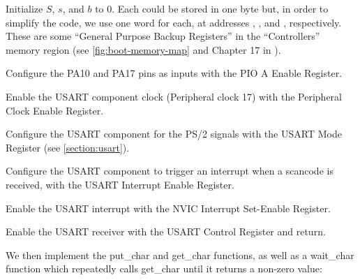 \begin{Paragraph}
\begin{paracol}{2}

Initialize $S$, $s$, and $b$ to 0. Each could be stored in one byte but, in
order to simplify the code, we use one word for each, at addresses
, , and
, respectively. These are some ``General Purpose
Backup Registers'' in the ``Controllers'' memory region (see
\cref{fig:boot-memory-map} and Chapter 17 in \cite{SAM3X8E}).


Configure the PA10 and PA17 pins as inputs with the PIO A Enable Register.


Enable the USART component clock (Peripheral clock 17) with the Peripheral
Clock Enable Register.


Configure the USART component for the PS/2 signals with the USART Mode Register
(see \cref{section:usart}).


Configure the USART component to trigger an interrupt when a scancode is
received, with the USART Interrupt Enable Register.


Enable the USART interrupt with the NVIC Interrupt Set-Enable Register.


Enable the USART receiver with the USART Control Register and return.

\end{paracol}
\end{Paragraph}

We then implement the put\_char and get\_char functions, as well as a
wait\_char function which repeatedly calls get\_char until it returns a
non-zero value:


